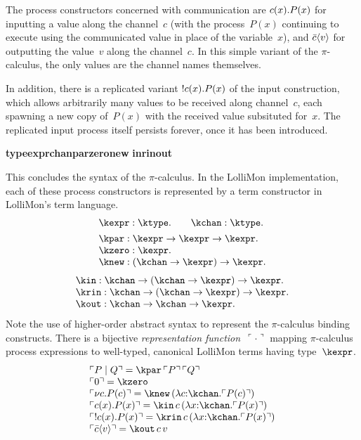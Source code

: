 \documentclass{sig-alt}
\begin{document}
The process constructors concerned with communication are $c(x).P(x)$ for
inputting a value along the channel~$c$ (with the process~$P(x)$
continuing to execute using the communicated value in place of
the variable~$x$), and $\bar{c}\langle v\rangle$
for outputting the value~$v$ along the channel~$c$. In this simple
variant of the $\pi$-calculus, the only values are the channel names
themselves.

In addition, there is a replicated variant $!c(x).P(x)$ of the
input construction, which allows arbitrarily many values to be
received along channel~$c$, each spawning a new copy of~$P(x)$ with
the received value subsituted for~$x$. The replicated input process
itself persists forever, once it has been introduced.

\def\rep#1{\ulcorner#1\urcorner}
\def\kwd#1{\expandafter\def\csname k#1\endcsname{\textbf{#1}}}
\kwd{type}\kwd{expr}\kwd{chan}\kwd{par}\kwd{zero}\kwd{new}
\kwd{in}\kwd{rin}\kwd{out}
\def\to{\rightarrow}

This concludes the syntax of the $\pi$-calculus. In the LolliMon
implementation, each of these process constructors is represented by a
term constructor in LolliMon's term language.
$$
\begin{array}{l}
  \kexpr : \ktype. \qquad  \kchan : \ktype. \\[1ex]

  \kpar : \kexpr \to \kexpr \to \kexpr. \\
  \kzero : \kexpr. \\
  \knew : (\kchan \to \kexpr) \to \kexpr. \\
\end{array}$$ $$\begin{array}{l}
  \kin : \kchan \to (\kchan \to \kexpr) \to \kexpr. \\
  \krin : \kchan \to (\kchan \to \kexpr) \to \kexpr. \\
  \kout : \kchan \to \kchan \to \kexpr.
\end{array}
$$
%
Note the use of higher-order abstract syntax to represent the
$\pi$-calculus binding constructs.  There is a bijective
\emph{representation function}~$\rep{\cdot}$ mapping $\pi$-calculus
process expressions to well-typed, canonical LolliMon terms having
type~$\kexpr$.
$$
\begin{array}{l}
  \rep{P\mid Q} = \kpar\,\rep{P}\,\rep{Q} \\
  \rep{0} = \kzero \\
  \rep{\nu c.P(c)} = \knew\,(\lambda c{:}\kchan.\rep{P(c)}) \\
  \rep{\pin{c}{x}.P(x)} = \kin\,c\,(\lambda x{:}\kchan.\rep{P(x)}) \\
  \rep{\prin{c}{x}.P(x)} = \krin\,c\,(\lambda x{:}\kchan.\rep{P(x)}) \\
  \rep{\pout{c}{v}} = \kout\,c\,v
\end{array}
$$
\end{document}
